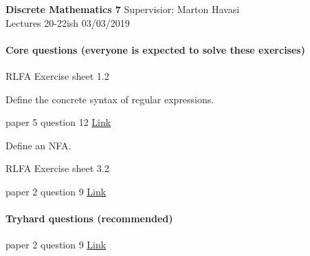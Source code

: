 \documentclass{exam}
\begin{document}
\noindent
\large\textbf{Discrete Mathematics 7} \hfill Supervisior: Marton Havasi \\
\normalsize Lectures 20-22ish \hfill 03/03/2019

\paragraph{Core questions (everyone is expected to solve these exercises)}
\begin{questions}

\question RLFA Exercise sheet 1.2

\question Define the concrete syntax of regular expressions.

 paper 5 question 12 \href{http://www.cl.cam.ac.uk/teaching/exams/pastpapers/y1993p5q12.pdf}{Link}

\question Define an NFA.

\question RLFA Exercise sheet 3.2

 paper 2 question 9 \href{http://www.cl.cam.ac.uk/teaching/exams/pastpapers/y2009p2q9.pdf}{Link}

\end{questions}

\paragraph{Tryhard questions (recommended)}
\begin{questions}

 paper 2 question 9 \href{http://www.cl.cam.ac.uk/teaching/exams/pastpapers/y2003p2q9.pdf}{Link}


\end{questions}
\end{document}
